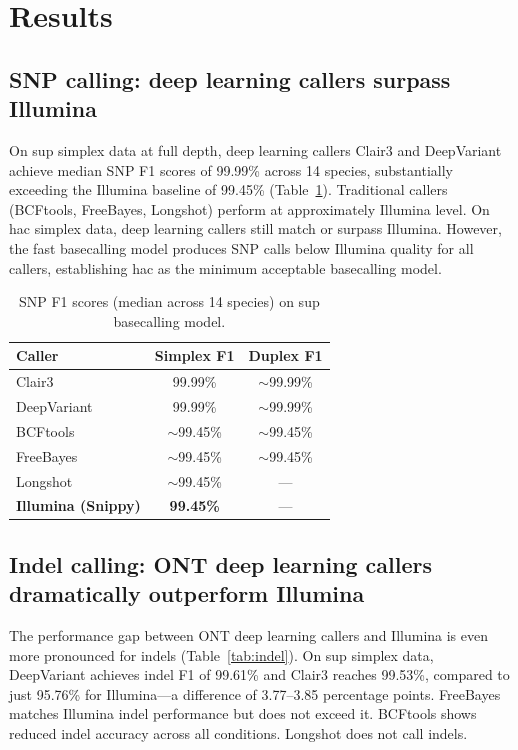 \documentclass[11pt]{article}
\begin{document}
\section{Results}

\subsection{SNP calling: deep learning callers surpass Illumina}

On sup simplex data at full depth, deep learning callers Clair3 and DeepVariant achieve median SNP F1 scores of 99.99\% across 14 species, substantially exceeding the Illumina baseline of 99.45\% (Table~\ref{tab:snp}). Traditional callers (BCFtools, FreeBayes, Longshot) perform at approximately Illumina level. On hac simplex data, deep learning callers still match or surpass Illumina. However, the fast basecalling model produces SNP calls below Illumina quality for all callers, establishing hac as the minimum acceptable basecalling model.

\begin{table}[htbp]
\centering
\caption{SNP F1 scores (median across 14 species) on sup basecalling model.}
\label{tab:snp}
\begin{tabular}{@{}lcc@{}}
\toprule
Caller & Simplex F1 & Duplex F1 \\
\midrule
Clair3                       & 99.99\% & $\sim$99.99\% \\
DeepVariant                  & 99.99\% & $\sim$99.99\% \\
BCFtools                     & $\sim$99.45\% & $\sim$99.45\% \\
FreeBayes                    & $\sim$99.45\% & $\sim$99.45\% \\
Longshot                     & $\sim$99.45\% & --- \\
\textbf{Illumina (Snippy)}  & \textbf{99.45\%} & --- \\
\bottomrule
\end{tabular}
\end{table}

\subsection{Indel calling: ONT deep learning callers dramatically outperform Illumina}

The performance gap between ONT deep learning callers and Illumina is even more pronounced for indels (Table~\ref{tab:indel}). On sup simplex data, DeepVariant achieves indel F1 of 99.61\% and Clair3 reaches 99.53\%, compared to just 95.76\% for Illumina---a difference of 3.77--3.85 percentage points. FreeBayes matches Illumina indel performance but does not exceed it. BCFtools shows reduced indel accuracy across all conditions. Longshot does not call indels.
\end{document}
